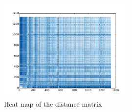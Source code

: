 \documentclass[11pt, oneside]{article}   	%
\begin{document}
\begin{figure}[h!]
        \centering
        \includegraphics[width=0.6\textwidth]{./pythonScripts/heatmap2.png}
        \caption{Heat map of the distance matrix}
	\label{figure:heatplot}
\end{figure}
\label{subsection:differenceActivityFeedback}
\end{document}
